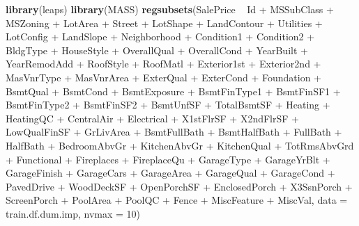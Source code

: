 \documentclass[]{article}
\newenvironment{Shaded}{\begin{snugshade}}{\end{snugshade}}
\newcommand{\KeywordTok}[1]{\textcolor[rgb]{0.13,0.29,0.53}{\textbf{{#1}}}}
\newcommand{\DataTypeTok}[1]{\textcolor[rgb]{0.13,0.29,0.53}{{#1}}}
\newcommand{\DecValTok}[1]{\textcolor[rgb]{0.00,0.00,0.81}{{#1}}}
\newcommand{\StringTok}[1]{\textcolor[rgb]{0.31,0.60,0.02}{{#1}}}
\newcommand{\NormalTok}[1]{{#1}}
\begin{document}
\begin{Shaded}
\begin{Highlighting}[]
\KeywordTok{library}\NormalTok{(leaps)}
\KeywordTok{library}\NormalTok{(MASS)}
\KeywordTok{regsubsets}\NormalTok{(SalePrice ~}\StringTok{ }\NormalTok{Id +}\StringTok{ }\NormalTok{MSSubClass +}\StringTok{ }\NormalTok{MSZoning  +}\StringTok{ }\NormalTok{LotArea +}\StringTok{ }\NormalTok{Street +}\StringTok{ }\NormalTok{LotShape +}\StringTok{ }\NormalTok{LandContour +}\StringTok{ }\NormalTok{Utilities +}\StringTok{ }\NormalTok{LotConfig +}\StringTok{ }\NormalTok{LandSlope +}\StringTok{ }\NormalTok{Neighborhood +}\StringTok{ }\NormalTok{Condition1 +}\StringTok{ }\NormalTok{Condition2 +}\StringTok{ }\NormalTok{BldgType +}\StringTok{ }\NormalTok{HouseStyle +}\StringTok{ }\NormalTok{OverallQual +}\StringTok{ }\NormalTok{OverallCond +}\StringTok{ }\NormalTok{YearBuilt +}\StringTok{ }\NormalTok{YearRemodAdd +}\StringTok{ }\NormalTok{RoofStyle +}\StringTok{ }\NormalTok{RoofMatl +}\StringTok{ }\NormalTok{Exterior1st +}\StringTok{ }\NormalTok{Exterior2nd +}\StringTok{ }\NormalTok{MasVnrType +}\StringTok{ }\NormalTok{MasVnrArea +}\StringTok{ }\NormalTok{ExterQual +}\StringTok{ }\NormalTok{ExterCond +}\StringTok{ }\NormalTok{Foundation +}\StringTok{ }\NormalTok{BsmtQual +}\StringTok{ }\NormalTok{BsmtCond +}\StringTok{ }\NormalTok{BsmtExposure +}\StringTok{ }\NormalTok{BsmtFinType1 +}\StringTok{ }\NormalTok{BsmtFinSF1 +}\StringTok{ }\NormalTok{BsmtFinType2 +}\StringTok{ }\NormalTok{BsmtFinSF2 +}\StringTok{ }\NormalTok{BsmtUnfSF +}\StringTok{ }\NormalTok{TotalBsmtSF +}\StringTok{ }\NormalTok{Heating +}\StringTok{ }\NormalTok{HeatingQC +}\StringTok{ }\NormalTok{CentralAir +}\StringTok{ }\NormalTok{Electrical +}\StringTok{ }\NormalTok{X1stFlrSF +}\StringTok{ }\NormalTok{X2ndFlrSF +}\StringTok{ }\NormalTok{LowQualFinSF +}\StringTok{ }\NormalTok{GrLivArea +}\StringTok{ }\NormalTok{BsmtFullBath +}\StringTok{ }\NormalTok{BsmtHalfBath +}\StringTok{ }\NormalTok{FullBath +}\StringTok{ }\NormalTok{HalfBath +}\StringTok{ }\NormalTok{BedroomAbvGr +}\StringTok{ }\NormalTok{KitchenAbvGr +}\StringTok{ }\NormalTok{KitchenQual +}\StringTok{ }\NormalTok{TotRmsAbvGrd +}\StringTok{ }\NormalTok{Functional +}\StringTok{ }\NormalTok{Fireplaces +}\StringTok{ }\NormalTok{FireplaceQu +}\StringTok{ }\NormalTok{GarageType +}\StringTok{ }\NormalTok{GarageYrBlt +}\StringTok{ }\NormalTok{GarageFinish +}\StringTok{ }\NormalTok{GarageCars +}\StringTok{ }\NormalTok{GarageArea +}\StringTok{ }\NormalTok{GarageQual +}\StringTok{ }\NormalTok{GarageCond +}\StringTok{ }\NormalTok{PavedDrive +}\StringTok{ }\NormalTok{WoodDeckSF +}\StringTok{ }\NormalTok{OpenPorchSF +}\StringTok{ }\NormalTok{EnclosedPorch +}\StringTok{ }\NormalTok{X3SsnPorch +}\StringTok{ }\NormalTok{ScreenPorch +}\StringTok{ }\NormalTok{PoolArea +}\StringTok{ }\NormalTok{PoolQC +}\StringTok{ }\NormalTok{Fence +}\StringTok{ }\NormalTok{MiscFeature +}\StringTok{ }\NormalTok{MiscVal, }\DataTypeTok{data =} \NormalTok{train.df.dum.imp, }\DataTypeTok{nvmax =} \DecValTok{10}\NormalTok{)}
\end{Highlighting}
\end{Shaded}
\end{document}
